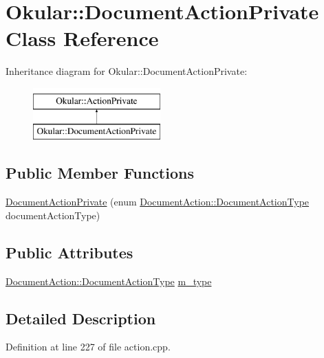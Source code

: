\hypertarget{classOkular_1_1DocumentActionPrivate}{\section{Okular\+:\+:Document\+Action\+Private Class Reference}
\label{classOkular_1_1DocumentActionPrivate}
}
Inheritance diagram for Okular\+:\+:Document\+Action\+Private\+:\begin{figure}[H]
\begin{center}
\leavevmode
\includegraphics[height=2.000000cm]{classOkular_1_1DocumentActionPrivate}
\end{center}
\end{figure}
\subsection*{Public Member Functions}
\begin{DoxyCompactItemize}
\item 
\hyperlink{classOkular_1_1DocumentActionPrivate_afe4e190c3510b60e831a728b3d075a0c}{Document\+Action\+Private} (enum \hyperlink{classOkular_1_1DocumentAction_a59b262b16719b9b55005d7c143f9415d}{Document\+Action\+::\+Document\+Action\+Type} document\+Action\+Type)
\end{DoxyCompactItemize}
\subsection*{Public Attributes}
\begin{DoxyCompactItemize}
\item 
\hyperlink{classOkular_1_1DocumentAction_a59b262b16719b9b55005d7c143f9415d}{Document\+Action\+::\+Document\+Action\+Type} \hyperlink{classOkular_1_1DocumentActionPrivate_a3bd97cd6371cd0ca7861c08b90f0d6b5}{m\+\_\+type}
\end{DoxyCompactItemize}


\subsection{Detailed Description}


Definition at line 227 of file action.\+cpp.



